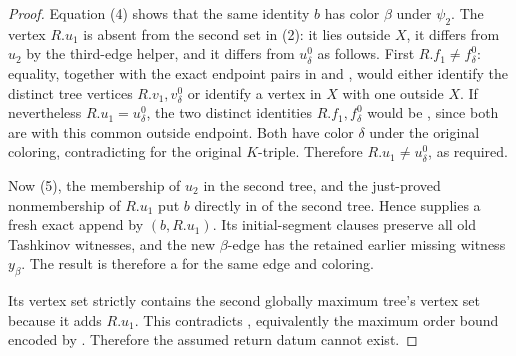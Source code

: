 \begin{proof}
Equation (4) shows that the same identity $b$ has color $\beta$ under
$\psi_2$.  The vertex $R.u_1$ is absent from the second set in (2): it
lies outside $X$, it differs from $u_2$ by the third-edge helper, and it
differs from $u^0_\delta$ as follows.  First $R.f_1\ne f^0_\delta$:
equality, together with the exact endpoint pairs in
 and
, would either identify the distinct tree
vertices $R.v_1,v^0_\delta$ or identify a vertex in $X$ with one outside
$X$.  If nevertheless $R.u_1=u^0_\delta$, the two distinct identities
$R.f_1,f^0_\delta$ would be , since both are
 with this common outside endpoint.  Both have color
$\delta$ under the original coloring, contradicting
 for the original $K$-triple.  Therefore
$R.u_1\ne u^0_\delta$, as required.

Now (5), the membership of $u_2$ in the second tree, and the just-proved
nonmembership of $R.u_1$ put $b$ directly in
 of the second tree.  Hence
 supplies a fresh exact
append by $(b,R.u_1)$.  Its initial-segment clauses preserve all old
Tashkinov witnesses, and the new $\beta$-edge has the retained earlier
missing witness $y_\beta$.  The result is therefore a
 for the same edge and coloring.

Its vertex set strictly contains the second globally maximum tree's
vertex set because it adds $R.u_1$.  This contradicts
, equivalently the maximum
order bound encoded by .  Therefore the assumed
return datum cannot exist.
\end{proof}
